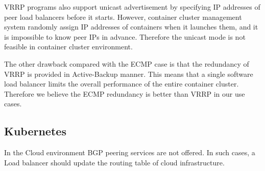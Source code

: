 VRRP programs also support unicast advertisement by specifying IP addresses of peer load balancers before it starts.
However, container cluster management system randomly assign IP addresses of containers when it launches them, and it is impossible to know peer IPs in advance. 
Therefore the unicast mode is not feasible in container cluster environment.

The other drawback compared with the ECMP case is that the redundancy of VRRP is provided in Active-Backup manner.
This means that a single software load balancer limits the overall performance of the entire container cluster.
Therefore we believe the ECMP redundancy is better than VRRP in our use cases.


\subsection{Kubernetes}

In the Cloud environment BGP peering services are not offered.
In such cases, a Load balancer should update the routing table of cloud infrastructure.


